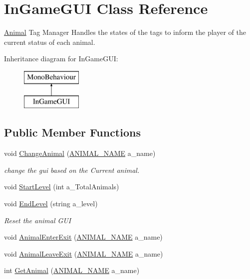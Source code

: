 \hypertarget{class_in_game_g_u_i}{}\section{In\+Game\+G\+UI Class Reference}
\label{class_in_game_g_u_i}


\mbox{\hyperlink{class_animal}{Animal}} Tag Manager Handles the states of the tags to inform the player of the current status of each animal.  


Inheritance diagram for In\+Game\+G\+UI\+:\begin{figure}[H]
\begin{center}
\leavevmode
\includegraphics[height=2.000000cm]{class_in_game_g_u_i}
\end{center}
\end{figure}
\subsection*{Public Member Functions}
\begin{DoxyCompactItemize}
\item 
void \mbox{\hyperlink{class_in_game_g_u_i_aeb8c5780050c59cd445fa3281bcdcee6}{Change\+Animal}} (\mbox{\hyperlink{_animal_8cs_a2fa5713399b84d1b88dae9196837af50}{A\+N\+I\+M\+A\+L\+\_\+\+N\+A\+ME}} a\+\_\+name)
\begin{DoxyCompactList}\small\item\em change the gui based on the Current animal. \end{DoxyCompactList}\item 
void \mbox{\hyperlink{class_in_game_g_u_i_a5b30adb22055f2da74973810a04e10e7}{Start\+Level}} (int a\+\_\+\+Total\+Animals)
\item 
void \mbox{\hyperlink{class_in_game_g_u_i_a11794815ae083601d8e81d90cbf8641f}{End\+Level}} (string a\+\_\+level)
\begin{DoxyCompactList}\small\item\em Reset the animal G\+UI \end{DoxyCompactList}\item 
void \mbox{\hyperlink{class_in_game_g_u_i_a4fe29a0f09284e08e713e823b9f5b73f}{Animal\+Enter\+Exit}} (\mbox{\hyperlink{_animal_8cs_a2fa5713399b84d1b88dae9196837af50}{A\+N\+I\+M\+A\+L\+\_\+\+N\+A\+ME}} a\+\_\+name)
\item 
void \mbox{\hyperlink{class_in_game_g_u_i_a1fd4667a2bb3474b90738f8e8c8db8c9}{Animal\+Leave\+Exit}} (\mbox{\hyperlink{_animal_8cs_a2fa5713399b84d1b88dae9196837af50}{A\+N\+I\+M\+A\+L\+\_\+\+N\+A\+ME}} a\+\_\+name)
\item 
int \mbox{\hyperlink{class_in_game_g_u_i_a83d88a7dd3b94adc2c555f077c852ec6}{Get\+Animal}} (\mbox{\hyperlink{_animal_8cs_a2fa5713399b84d1b88dae9196837af50}{A\+N\+I\+M\+A\+L\+\_\+\+N\+A\+ME}} a\+\_\+name)
\end{DoxyCompactItemize}

